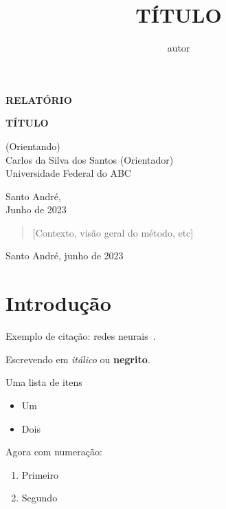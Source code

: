 \documentclass[12pt]{article}
\title{TÍTULO}
\author{autor}
\begin{document}
\thispagestyle{empty}

    
    \begin{flushright}
        \begin{huge}
            \textbf{RELATÓRIO}\\[3,5cm]
        \end{huge}

{\bf \LARGE  TÍTULO}

\bigskip
        
        (Orientando)\\
        Carlos da Silva dos Santos (Orientador)\\
        Universidade Federal do ABC\\[5,5cm]
    \end{flushright}
    
    \begin{center}
        Santo André,\\
        Junho de 2023
    \end{center}
    
    \newpage
\bigskip

\begin{center}
\end{center}

\begin{quote}
[Contexto, visão geral do método, etc]
\end{quote}

\begin{center}
Santo André, junho de 2023
\end{center}

\newpage
\bigskip

\section{Introdução}
\label{sec:introducao}

Exemplo de citação: redes neurais~\cite{alexnet2012}.

Escrevendo em \emph{itálico} ou \textbf{negrito}.

Uma lista de itens
\begin{itemize}
 \item Um
 \item Dois
\end{itemize}

Agora com numeração:
\begin{enumerate}
    \item Primeiro
    \item Segundo
\end{enumerate}
\end{document}
